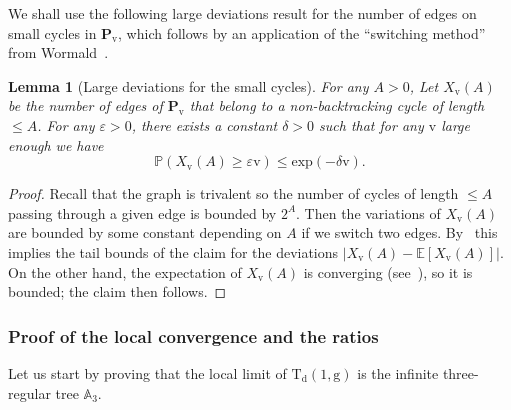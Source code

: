 \documentclass[10pt]{amsart}
\theoremstyle{plain}
\newtheorem{lemma}[theorem]{Lemma}
\theoremstyle{definition}
\theoremstyle{remark}
\renewcommand{\P}{\mathbb{P}}
\newcommand{\E}{\mathbb{E}}
\newcommand{\Triv}{\mathrm{T}}
\newcommand{\defect}{\mathrm{d}}
\newcommand{\gen}{\mathrm{g}}
\newcommand{\ver}{\mathrm{v}}
\begin{document}
We shall use the following large deviations result for the number of edges on small cycles in $\mathbf{P}_{\ver}$, which follows by an application of the ``switching method'' from Wormald~\cite[Th.\,2.19]{Wor99}.

\begin{lemma}[Large deviations for the small cycles]
\label{lem:grandes_dev_cycles_config}
For any $A>0$, Let $X_{ \ver}(A)$ be the number of edges of $\mathbf{P}_{\ver}$ that belong to a non-backtracking cycle of length $\leq A$. For any $ \varepsilon>0$, there exists a constant $ \delta >0$ such that for any $\ver$ large enough we have
\[
\P(X_{ \ver}(A) \geq \varepsilon \ver) \leq \mathrm{exp}(- \delta \ver).
\]
\end{lemma}

\begin{proof}
Recall that the graph is trivalent so the number of cycles of length $\leq A$ passing through a given edge is bounded by $2^A$. Then the variations of $ X_{ \ver}(A)$ are bounded by some constant depending on $A$ if we switch two edges. By~\cite[Th.\,2.19]{Wor99} this implies the tail bounds of the claim for the deviations $|X_{ \ver}(A) - \E[X_{ \ver}(A)]|$. On the other hand, the expectation of $X_{ \ver}(A)$ is converging (see~\cite[Eq.\,(8) in \S2.3]{Wor99}), so it is bounded; the claim then follows.
\end{proof}

\subsubsection{Proof of the local convergence and the ratios}

Let us start by proving that the local limit of $ \Triv_{\defect}(1, \gen)$ is the infinite three-regular tree $\mathbb{A}_3$.
\end{document}
